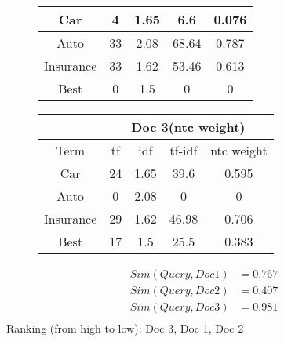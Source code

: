 \documentclass[11pt]{article}
\begin{document}
\begin{figure}[H]
\begin{minipage}{0.5\linewidth}
\begin{table}[H]
\begin{tabular}{|c|c|c|c|c|}
        Car      & 4  &1.65 & 6.6  & 0.076 \\ \hline
        Auto     & 33 &2.08 & 68.64& 0.787\\ \hline
        Insurance& 33 &1.62 & 53.46& 0.613\\ \hline
        Best     & 0  &1.5  & 0    & 0\\ \hline
      \end{tabular}
    \end{table}
  \end{minipage}
  \begin{minipage}{0.5\linewidth}
    \begin{table}[H]
      \centering
      \begin{tabular}{|c|c|c|c|c|} \hline
        & \multicolumn{4}{|c|}{Doc 3(ntc weight)}\\ \hline
        Term     & tf & idf & tf-idf & ntc weight \\ \hline
        Car      & 24 &1.65 & 39.6 & 0.595 \\ \hline
        Auto     & 0  &2.08 & 0    & 0\\ \hline
        Insurance& 29 &1.62 & 46.98& 0.706\\ \hline
        Best     & 17 &1.5  & 25.5 & 0.383\\ \hline
      \end{tabular}
    \end{table}
  \end{minipage}
\end{figure}
\begin{align*}
  Sim(Query, Doc 1) &= 0.767 \\
  Sim(Query, Doc 2) &= 0.407 \\
  Sim(Query, Doc 3) &= 0.981 \\
\end{align*}
Ranking (from high to low): Doc 3, Doc 1, Doc 2
\end{document}
